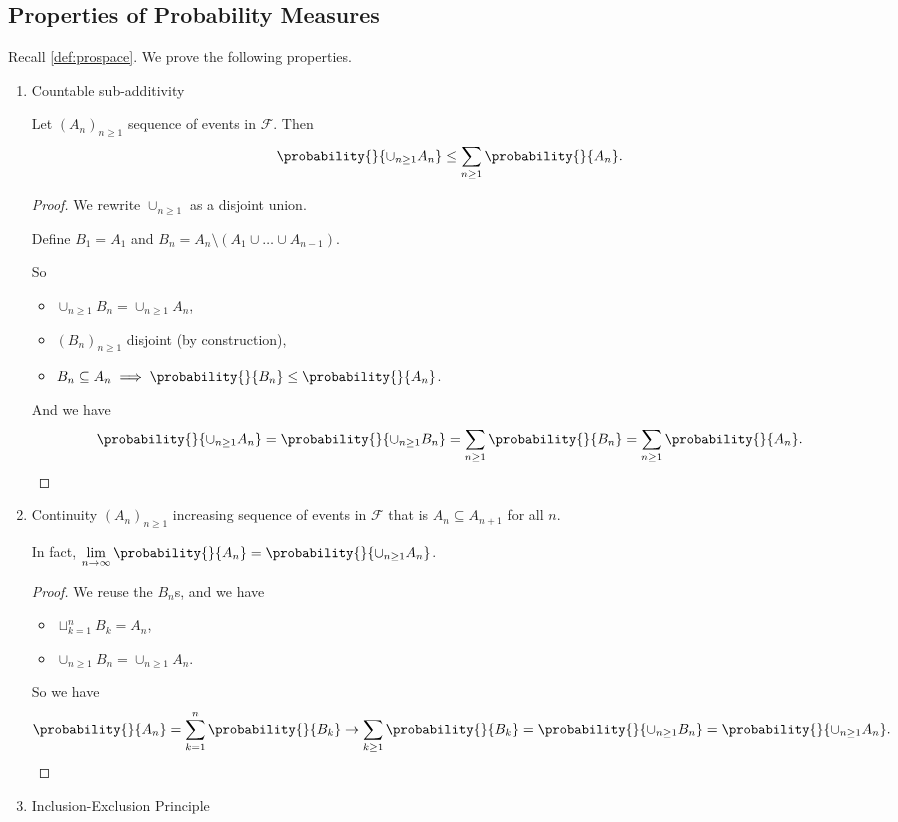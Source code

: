 \subsection{Properties of Probability Measures}
Recall \cref{def:prospace}. We prove the following properties.
\begin{property}
    \leavevmode
    \begin{enumerate}
        \item Countable sub-additivity

        Let \((A_n)_{n\geq 1}\) sequence of events in \(\mathcal{F} \). Then
        \[
            \probability{}{\cup_{n\geq 1}A_n}\leq \sum\limits_{n\geq 1}\probability{}{A_n} .
        \]
        \begin{proof}
            We rewrite \(\cup_{n\geq 1}\) as a disjoint union.
            
            Define \(B_1 = A_1\) and \(B_n = A_n \setminus (A_1\cup \ldots \cup A_{n-1} )\).

            So
            \begin{itemize}
                \item \(\cup_{n\geq 1} B_n = \cup_{n\geq 1}A_n\),
                \item \((B_n)_{n\geq 1}\) disjoint (by construction),
                \item \(B_n \subseteq A_n \implies \probability{}{B_n} \leq \probability{}{A_n}\).
            \end{itemize}

            And we have
            \[
                \probability{}{\cup_{n\geq 1}A_n} = \probability{}{\cup_{n\geq 1}B_n} = \sum\limits_{n\geq 1}\probability{}{B_n} = \sum\limits_{n\geq 1}\probability{}{A_n}.
            \]
        \end{proof}
        \item Continuity
        \((A_n)_{n\geq 1}\) increasing sequence of events in \(\mathcal{F} \) that is \(A_n \subseteq A_{n+1}\) for all \(n\).

        In fact, \(\lim\limits_{n \to \infty} \probability{}{A_n} = \probability{}{\cup_{n\geq 1}A_n} \).
        
        \begin{proof}
            We reuse the \(B_n\)s, and we have
            \begin{itemize}
                \item \(\sqcup_{k=1}^n B_k = A_n\),
                \item \(\cup_{n\geq 1}B_n = \cup_{n\geq 1}A_n\).
            \end{itemize}
            So we have
            \[
                \probability{}{A_n} =\sum\limits_{k=1}^{n} \probability{}{B_k} \to \sum\limits_{k\geq 1}^{}\probability{}{B_k}=\probability{}{\cup_{n\geq 1}B_{n}} = \probability{}{\cup_{n\geq 1}A_n}.
            \]
        \end{proof}
        \item Inclusion-Exclusion Principle


\end{enumerate}
\end{property}
